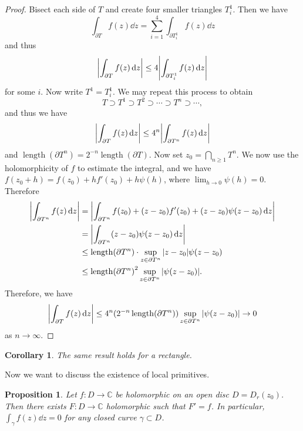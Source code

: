 \documentclass[leqno, openany]{memoir}
\newtheorem{cor}[thm]{Corollary}
\newtheorem{prop}[thm]{Proposition}
\theoremstyle{definition}
\theoremstyle{remark}
\theoremstyle{plain}
\theoremstyle{definition}
\theoremstyle{remark}
\newcommand{\C}{\mathbb{C}}
\DeclareMathOperator{\len}{length}
\begin{document}
\begin{proof} Bisect each side of $T$ and create four smaller triangles
    $T_i^1$. Then we have \[ \int_{\partial T} f(z) \dd{z} = \sum_{i=1}^4
        \int_{\partial T_i^1} f(z) \dd{z} \] and thus \[ \abs{\int_{\partial T}
    f(z) \dd{z}} \leq 4 \abs{\int_{\partial T_i^1} f(z) \dd{z}} \] for some
    $i$. Now write $T^1 = T_i^1$. We may repeat this process to obtain \[ T
        \supset T^1 \supset T^2 \supset \cdots \supset T^n \supset \cdots, \]
        and thus we have \[ \abs{\int_{\partial T} f(z) \dd{z}} \leq 4^n
        \abs{\int_{\partial T^n} f(z) \dd{z}} \] and $\len(\partial T^n) =
        2^{-n} \len(\partial T)$. Now set $z_0 = \bigcap_{n \geq 1} T^n$. We
        now use the holomorphicity of $f$ to estimate the integral, and we have
        $f(z_0 + h) = f(z_0) + hf'(z_0) + h \psi(h)$, where $\lim_{h \to 0}
        \psi(h) = 0$. Therefore \begin{align*} \abs{\int_{\partial T^n} f(z)
            \dd{z}} &= \abs{\int_{\partial T^n} f(z_0) + (z-z_0)f'(z_0) +
        (z-z_0) \psi(z-z_0) \dd{z}} \\ &= \abs{\int_{\partial T^n} (z-z_0)
    \psi(z-z_0) \dd{z}} \\ &\leq \len(\partial T^n) \cdot \sup_{z \in \partial
T^n} \abs{z-z_0}{\psi(z-z_0)} \\ &\leq {\len(\partial T^n)}^2 \sup_{z \in
\partial T^n} \abs{\psi(z-z_0)}.  \end{align*} Therefore, we have \[
\abs{\int_{\partial T} f(z) \dd{z}} \leq 4^n {(2^{-n} \len(\partial T^n))}
\sup_{z \in \partial T^n} \abs{\psi(z-z_0)} \to 0 \] as $n \to \infty$.
\end{proof}

\begin{cor} The same result holds for a rectangle.  \end{cor}

Now we want to discuss the existence of local primitives.

\begin{prop} Let $f \colon D \to \C$ be holomorphic on an open disc $D =
    D_r(z_0)$. Then there exists $F \colon D \to \C$ holomorphic such that $F'
    = f$. In particular, $\int_{\gamma} f(z) \dd{z} = 0$ for any closed curve
    $\gamma \subset D$.  \end{prop}
\end{document}
